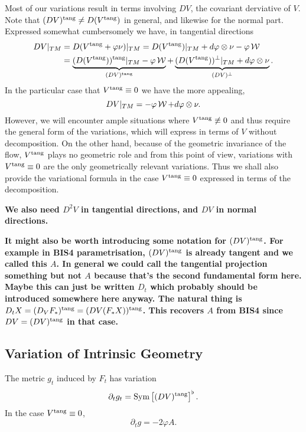 \begin{rem}
Most of our variations result in terms involving \(DV\), the covariant derviative of \(V\). Note that \((DV)^{\operatorname{tang}} \ne D(V^{\operatorname{tang}})\) in general, and likewise for the normal part. Expressed somewhat cumbersomely we have, in tangential directions
\[
\begin{split}
DV|_{TM} &= D(V^{\operatorname{tang}} + \varphi \nu)|_{TM} = D(V^{\operatorname{tang}})|_{TM} + d\varphi \otimes \nu - \varphi\operatorname{\mathcal{W}} \\
&= \underbrace{(D(V^{\operatorname{tang}}))^{\operatorname{tang}}|_{TM} - \varphi\operatorname{\mathcal{W}}}_{(DV)^{\operatorname{tang}}} + \underbrace{(D(V^{\operatorname{tang}}))^{\perp}|_{TM} + d\varphi \otimes \nu}_{(DV)^{\perp}}.
\end{split}
\]
In the particular case that \(V^{\operatorname{tang}} \equiv 0\) we have the more appealing,
\[
DV|_{TM} = -\varphi\operatorname{\mathcal{W}} + d\varphi \otimes \nu.
\]
However, we will encounter ample situations where \(V^{\operatorname{tang}} \not\equiv 0\) and thus require the general form of the variations, which will express in terms of \(V\) without decomposition. On the other hand, because of the geometric invariance of the flow, \(V^{\operatorname{tang}}\) plays no geometric role and from this point of view, variations with \(V^{\operatorname{tang}} \equiv 0\) are the only geometrically relevant variations. Thus we shall also provide the variational formula in the case \(V^{\operatorname{tang}} \equiv 0\) expressed in terms of the decomposition.

\textbf{We also need \(D^2 V\) in tangential directions, and \(DV\) in normal directions.}
\end{rem}

\textbf{It might also be worth introducing some notation for \((DV)^{\operatorname{tang}}\). For example in BIS4 parametrisation, \((DV)^{\operatorname{tang}}\) is already tangent and we called this \(A\). In general we could call the tangential projection something but not \(A\) because that's the second fundamental form here. Maybe this can just be written \(D_t\) which probably should be introduced somewhere here anyway. The natural thing is \(D_t X = (D_V F_{\ast})^{\operatorname{tang}} = (DV (F_{\ast} X))^{\operatorname{tang}}\). This recovers \(A\) from BIS4 since \(DV = (DV)^{\operatorname{tang}}\) in that case.}

\subsection*{Variation of Intrinsic Geometry}

\begin{lemma}
\label{lem:dt_g}
The metric \(g_t\) induced by \(F_t\) has variation
\[
\partial_t g_t = \operatorname{Sym} \left[(DV)^{\operatorname{tang}}\right]^{\flat}.
\]
In the case \(V^{\operatorname{tang}} \equiv 0\),
\[
\partial_t g = -2 \varphi A.
\]
\end{lemma}

